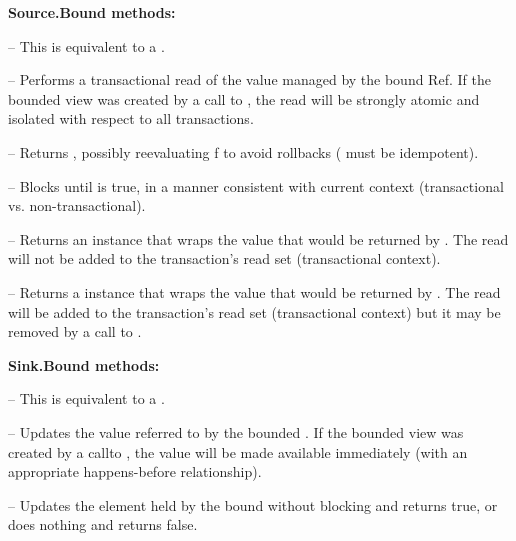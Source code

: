 \textbf{Source.Bound methods:}
\begin{packed_itemize}
\item {} -- This is equivalent to a .
\item {} -- Performs a transactional read of the value 
managed by the bound Ref. If the bounded view was created by a call to , the read will
be strongly atomic and isolated with respect to all transactions.
\item {} -- Returns , possibly 
reevaluating f to avoid rollbacks ( must be idempotent).
\item {} -- Blocks until  is true, in a 
manner consistent with current context (transactional vs. non-transactional).
\item {} -- Returns an  instance that 
wraps the value that would be returned by . The read will not be added to the transaction's read set (transactional context).
\item {} -- Returns a  instance that 
wraps the value that would be returned by . The read will be added to the transaction's read set (transactional context) but it may be removed by a call to 
.
\end{packed_itemize}

\textbf{Sink.Bound methods:}
\begin{packed_itemize}
\item {} -- This is equivalent to a .
\item {} -- Updates the value referred to by the bounded . 
If the bounded view was created by a callto , the value will be made available
immediately (with an appropriate happens-before relationship).
\item {} -- Updates the element held by the bound  without blocking 
and returns true, or does nothing and returns false.
\end{packed_itemize}

